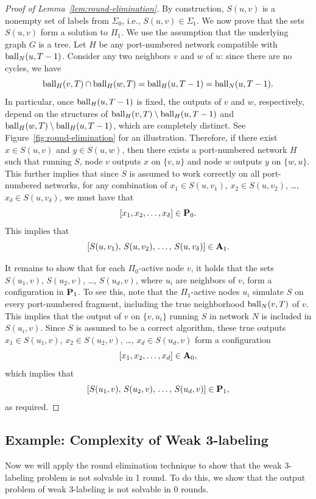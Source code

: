 \begin{proof}[Proof of Lemma~\ref{lem:round-elimination}]
	By construction, $S(u,v)$ is a nonempty set of labels from $\Sigma_0$, i.e., $S(u,v) \in \Sigma_1$. We now prove that the sets $S(u,v)$ form a solution to $\Pi_1$. We use the assumption that the underlying graph $G$ is a tree. Let $H$ be any port-numbered network compatible with $\operatorname{ball}_{N}(u,T-1)$. Consider any two neighbors $v$ and $w$ of $u$: since there are no cycles, we have
	\[\operatorname{ball}_{H}(v,T) \cap \operatorname{ball}_{H}(w,T) = \operatorname{ball}_{H}(u,T-1) = \operatorname{ball}_{N}(u,T-1).\]
	In particular, once $\operatorname{ball}_{H}(u,T-1)$ is fixed, the outputs of $v$ and $w$, respectively, depend on the structures of $\operatorname{ball}_{H}(v,T) \setminus \operatorname{ball}_{H}(u,T-1)$ and $\operatorname{ball}_{H}(w,T) \setminus \operatorname{ball}_{H}(u,T-1)$, which are completely distinct. See Figure~\ref{fig:round-elimination} for an illustration. Therefore, if there exist $x \in S(u,v)$ and $y \in S(u,w)$, then there exists a port-numbered network $H$ such that running $S$, node $v$ outputs $x$ on $\{v,u\}$ and node $w$ outputs $y$ on $\{ w,u \}$. This further implies that since $S$ is assumed to work correctly on all port-numbered networks, for any combination of $x_1 \in S(u,v_1)$, $x_2 \in S(u,v_2)$, \ldots, $x_{\delta} \in S(u,v_{\delta})$, we must have that \[[x_1, x_2, \dots, x_{\delta}] \in \mathbf{P}_0.\] This implies that
	\[
		[S(u,v_1),\, S(u,v_2),\, \dotsc,\, S(u, v_{\delta})] \in \mathbf{A}_1.
	\]
	
	It remains to show that for each $\Pi_0$-active node $v$, it holds that the sets $S(u_1, v)$, $S(u_2, v)$, \ldots, $S(u_d, v)$, where $u_i$ are neighbors of $v$, form a configuration in $\mathbf{P}_1$. To see this, note that the $\Pi_1$-active nodes $u_i$ simulate $S$ on every port-numbered fragment, including the true neighborhood $\operatorname{ball}_{N}(v,T)$ of $v$. This implies that the output of $v$ on $\{v,u_i\}$ running $S$ in network $N$ is included in $S(u_i, v)$. Since $S$ is assumed to be a correct algorithm, these true outputs $x_1 \in S(u_1, v)$, $x_2 \in S(u_2, v)$, \ldots, $x_{d} \in S(u_d,v)$ form a configuration \[[x_1, x_2, \dots, x_d] \in \mathbf{A}_0,\] which implies that
	\[
		[S(u_1, v),\, S(u_2, v),\, \dots,\, S(u_d,v)] \in \mathbf{P}_1,
	\] as required. 
\end{proof}

\subsection{Example: Complexity of Weak 3-labeling} \label{ssec:output-weak3}

Now we will apply the round elimination technique to show that the weak 3-labeling problem is not solvable in 1 round. To do this, we show that the output problem of weak 3-labeling is not solvable in 0 rounds.

